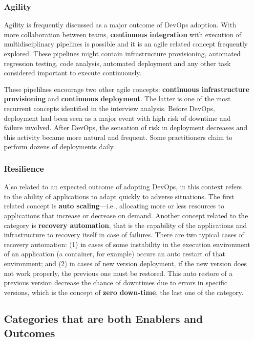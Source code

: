 \subsubsection{Agility}

Agility is frequently discussed as a major outcome of DevOps adoption. With more
collaboration between teams, \textbf{continuous integration} with execution of
multidisciplinary pipelines is possible and it is an agile related concept
frequently explored. These pipelines might contain
infrastructure provisioning, automated regression testing, code analysis,
automated deployment and any other task considered important to
execute continuously.

These pipelilnes encourage two other agile concepts: \textbf{continuous
infrastructure provisioning} and \textbf{continuous deployment}. The latter is
one of the most recurrent concepts identified in the interview analysis. Before
DevOps, deployment had been seen as a major event with high risk of downtime and
failure involved. After DevOps, the sensation of risk in deployment decreases
and this activity became more natural and frequent. Some practitioners claim
to perform dozens of deployments daily.

\subsubsection*{Resilience}

Also related to an expected outcome of adopting DevOps,  in this
context refers to the ability of applications to adapt quickly to adverse situations.
The first related concept is \textbf{auto scaling}---i.e.,
allocating more or less resources to applications that increase or
decrease on demand. Another concept related to
the  category is \textbf{recovery automation}, that is
the capability of the applications and infrastructure to recovery itself in case of
failures. There are two typical cases of recovery automation: (1) in cases
of some instability in the execution environment of an application (a
container, for example) occurs an auto restart of that environment; and (2) in
cases of new version deployment, if the new version does not work properly, the
previous one must be restored. This auto restore of a previous version
decrease the chance of downtimes due to errors in specific versions, which
is the concept of \textbf{zero down-time}, the last one of the  category.

\subsection{Categories that are both Enablers and Outcomes}

